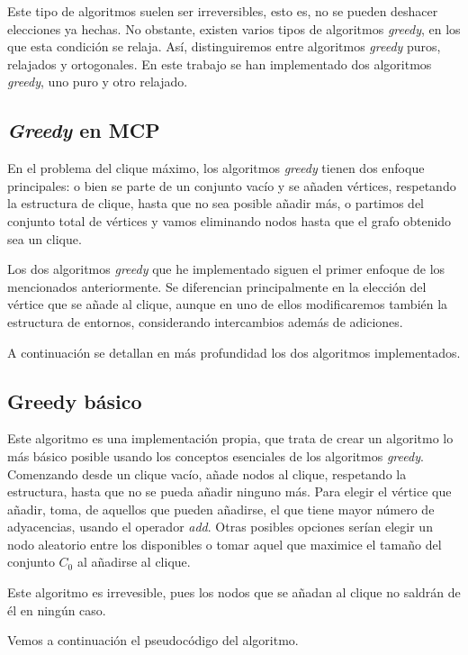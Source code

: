 Este tipo de algoritmos suelen ser irreversibles, esto es, no se pueden deshacer elecciones ya hechas.
No obstante, existen varios tipos de algoritmos \textit{greedy}, en los que esta condición se relaja. Así,
distinguiremos entre algoritmos \textit{greedy} puros, relajados y ortogonales. En este trabajo se han
implementado dos algoritmos \textit{greedy}, uno puro y otro relajado.

\subsection{\textit{Greedy} en MCP}

En el problema del clique máximo, los algoritmos \textit{greedy} tienen dos enfoque principales:
o bien se parte de un conjunto vacío y se añaden vértices, respetando la estructura de clique,
hasta que no sea posible añadir más, o partimos del conjunto total de vértices y vamos eliminando
nodos hasta que el grafo obtenido sea un clique.

Los dos algoritmos \textit{greedy} que he implementado siguen el primer enfoque de los
mencionados anteriormente. Se diferencian principalmente en la elección del vértice que
se añade al clique, aunque en uno de ellos modificaremos también la estructura de entornos,
considerando intercambios además de adiciones.

A continuación se detallan en más profundidad los dos algoritmos implementados.

\subsection{Greedy básico}\label{greedy1}

Este algoritmo es una implementación propia, que trata de crear un algoritmo lo más
básico posible usando los conceptos esenciales de los algoritmos \textit{greedy}.
Comenzando desde un clique vacío, añade nodos al clique, respetando la estructura, hasta
que no se pueda añadir ninguno más. Para elegir el vértice que añadir, toma, de aquellos que
pueden añadirse, el que tiene mayor número de adyacencias, usando el operador \textit{add}.
Otras posibles opciones serían elegir un nodo aleatorio entre los disponibles o tomar aquel que
maximice el tamaño del conjunto $C_0$ al añadirse al clique.

Este algoritmo es irrevesible, pues los nodos que se añadan al clique no saldrán de él
en ningún caso.

Vemos a continuación el pseudocódigo del algoritmo.


